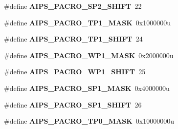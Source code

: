 \begin{DoxyCompactItemize}
\item 
\#define {\bfseries A\+I\+P\+S\+\_\+\+P\+A\+C\+R\+O\+\_\+\+S\+P2\+\_\+\+S\+H\+I\+FT}~22\hypertarget{group__AIPS__Register__Masks_ga7b67fb0767452471cc1ad1afc9d5e142}{}\label{group__AIPS__Register__Masks_ga7b67fb0767452471cc1ad1afc9d5e142}

\item 
\#define {\bfseries A\+I\+P\+S\+\_\+\+P\+A\+C\+R\+O\+\_\+\+T\+P1\+\_\+\+M\+A\+SK}~0x1000000u\hypertarget{group__AIPS__Register__Masks_ga26b62ac3d6a4b73a5ab591d34080d80e}{}\label{group__AIPS__Register__Masks_ga26b62ac3d6a4b73a5ab591d34080d80e}

\item 
\#define {\bfseries A\+I\+P\+S\+\_\+\+P\+A\+C\+R\+O\+\_\+\+T\+P1\+\_\+\+S\+H\+I\+FT}~24\hypertarget{group__AIPS__Register__Masks_gafaf4aa774127fcacd3a95c5923d44742}{}\label{group__AIPS__Register__Masks_gafaf4aa774127fcacd3a95c5923d44742}

\item 
\#define {\bfseries A\+I\+P\+S\+\_\+\+P\+A\+C\+R\+O\+\_\+\+W\+P1\+\_\+\+M\+A\+SK}~0x2000000u\hypertarget{group__AIPS__Register__Masks_ga228678b7f73628883ad2b57f3127fe3c}{}\label{group__AIPS__Register__Masks_ga228678b7f73628883ad2b57f3127fe3c}

\item 
\#define {\bfseries A\+I\+P\+S\+\_\+\+P\+A\+C\+R\+O\+\_\+\+W\+P1\+\_\+\+S\+H\+I\+FT}~25\hypertarget{group__AIPS__Register__Masks_ga7e390e7dbe191ee0be76d3a3363053a3}{}\label{group__AIPS__Register__Masks_ga7e390e7dbe191ee0be76d3a3363053a3}

\item 
\#define {\bfseries A\+I\+P\+S\+\_\+\+P\+A\+C\+R\+O\+\_\+\+S\+P1\+\_\+\+M\+A\+SK}~0x4000000u\hypertarget{group__AIPS__Register__Masks_ga9329c0cf43e281b1360d8e33fe2a3bbc}{}\label{group__AIPS__Register__Masks_ga9329c0cf43e281b1360d8e33fe2a3bbc}

\item 
\#define {\bfseries A\+I\+P\+S\+\_\+\+P\+A\+C\+R\+O\+\_\+\+S\+P1\+\_\+\+S\+H\+I\+FT}~26\hypertarget{group__AIPS__Register__Masks_ga99565adc81e770760009c005553da53f}{}\label{group__AIPS__Register__Masks_ga99565adc81e770760009c005553da53f}

\item 
\#define {\bfseries A\+I\+P\+S\+\_\+\+P\+A\+C\+R\+O\+\_\+\+T\+P0\+\_\+\+M\+A\+SK}~0x10000000u\hypertarget{group__AIPS__Register__Masks_ga4f6de33166491a5b7c295151de0113e2}{}\label{group__AIPS__Register__Masks_ga4f6de33166491a5b7c295151de0113e2}


\end{DoxyCompactItemize}

